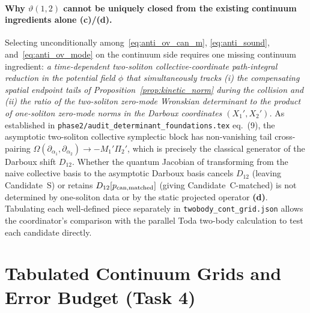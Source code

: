 \documentclass[11pt,a4paper]{article}
\newcommand{\Lc}{\textbf{(c)}}
\newcommand{\Ld}{\textbf{(d)}}
\newcommand{\script}[1]{\texttt{#1}}
\begin{document}
\paragraph{Why $\vartheta(1,2)$ cannot be uniquely closed from the existing continuum ingredients alone \Lc/\Ld.}
Selecting unconditionally among~\eqref{eq:anti_ov_can_m}, \eqref{eq:anti_sound}, and~\eqref{eq:anti_ov_mode} on the continuum side requires one missing continuum ingredient: \emph{a time-dependent two-soliton collective-coordinate path-integral reduction in the potential field $\phi$ that simultaneously tracks (i) the compensating spatial endpoint tails of Proposition~\ref{prop:kinetic_norm} during the collision and (ii) the ratio of the two-soliton zero-mode Wronskian determinant to the product of one-soliton zero-mode norms in the Darboux coordinates $(X_1',X_2')$.} As established in \texttt{phase2/audit\_determinant\_foundations.tex} eq.~(9), the asymptotic two-soliton collective symplectic block has non-vanishing tail cross-pairing $\Omega(\partial_{\alpha_1},\partial_{\alpha_2})\to -M_1'\Pi_2'$, which is precisely the classical generator of the Darboux shift $D_{12}$. Whether the quantum Jacobian of transforming from the naive collective basis to the asymptotic Darboux basis cancels $D_{12}$ (leaving Candidate~S) or retains $D_{12}[p_{\rm can,matched}]$ (giving Candidate~C-matched) is not determined by one-soliton data or by the static projected operator \Ld. Tabulating each well-defined piece separately in \script{twobody\_cont\_grid.json} allows the coordinator's comparison with the parallel Toda two-body calculation to test each candidate directly.

\section{Tabulated Continuum Grids and Error Budget (Task 4)}
\end{document}

